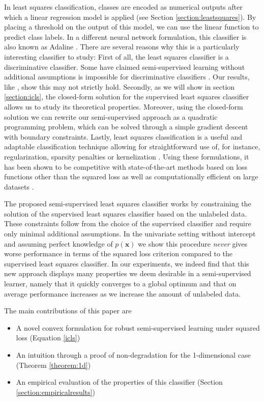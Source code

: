 \documentclass{elsarticle}
\begin{document}
In least squares classification, classes are encoded as numerical outputs after which a linear regression model is applied (see Section \ref{section:leastsquares}). By placing a threshold on the output of this model, we can use the linear function to predict class labels. 
In a different neural network formulation, this classifier is also known as Adaline \cite{Widrow1960}.
There are several reasons why this is a particularly interesting classifier to study: 
First of all, the least squares classifier is a discriminative classifier. 
Some have claimed semi-supervised learning without additional assumptions is impossible for discriminative classifiers \cite{Seeger2001,Singh2008}. 
Our results, like \cite{Sokolovska2008}, show this may not strictly hold. 
Secondly, as we will show in section \ref{section:icls}, the closed-form solution for the supervised least squares classifier allows us to study its theoretical properties.
Moreover, using the closed-form solution we can rewrite our semi-supervised approach as a quadratic programming problem, which can be solved through a simple gradient descent with boundary constraints. 
Lastly, least squares classification is a useful and adaptable classification technique  allowing for straightforward use of, for instance, regularization, sparsity penalties or kernelization \cite{Hastie2001,Rifkin2003,Tibshirani1996,Poggio2003}. 
Using these formulations, it has been shown to be competitive with state-of-the-art methods based on loss functions other than the squared loss \cite{Rifkin2003} as well as computationally efficient on large datasets \cite{Bottou2010}.

The proposed semi-supervised least squares classifier works by constraining the solution of the supervised least squares classifier based on the unlabeled data. 
These constraints follow from the choice of the supervised classifier and require only minimal additional assumptions.
In the univariate setting without intercept and assuming perfect knowledge of $p(\mathbf{x})$ we show this procedure \emph{never} gives worse performance in terms of the squared loss criterion compared to the supervised least squares classifier. 
In our experiments, we indeed find that this new approach displays many properties we deem desirable in a semi-supervised learner, namely that it quickly converges to a global optimum and that on average performance increases as we increase the amount of unlabeled data.

The main contributions of this paper are

\begin{itemize}
  \item A novel convex formulation for robust semi-supervised learning under squared loss (Equation \eqref{icls})
  \item An intuition through a proof of non-degradation for the 1-dimensional case (Theorem \ref{theorem:1d})
  \item An empirical evaluation of the properties of this classifier (Section \ref{section:empiricalresults})
\end{itemize}
\end{document}
